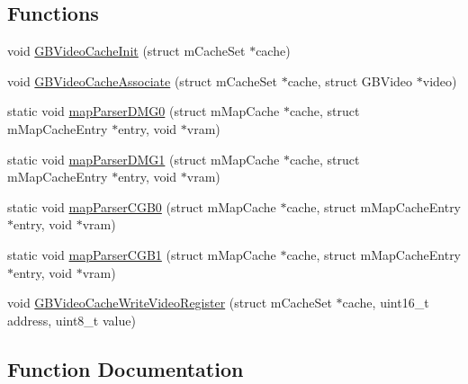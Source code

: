\subsection*{Functions}
\begin{DoxyCompactItemize}
\item 
void \mbox{\hyperlink{gb_2renderers_2cache-set_8c_ae7e228e583d5f680af631188c85bdf5e}{G\+B\+Video\+Cache\+Init}} (struct m\+Cache\+Set $\ast$cache)
\item 
void \mbox{\hyperlink{gb_2renderers_2cache-set_8c_ab2420f444ebe87f2f01729e2a3f66e37}{G\+B\+Video\+Cache\+Associate}} (struct m\+Cache\+Set $\ast$cache, struct G\+B\+Video $\ast$video)
\item 
static void \mbox{\hyperlink{gb_2renderers_2cache-set_8c_a048d8d609b74b62fd9a0812bcb0474a0}{map\+Parser\+D\+M\+G0}} (struct m\+Map\+Cache $\ast$cache, struct m\+Map\+Cache\+Entry $\ast$entry, void $\ast$vram)
\item 
static void \mbox{\hyperlink{gb_2renderers_2cache-set_8c_a0a1e89b599746b796592de6e1eab8e2b}{map\+Parser\+D\+M\+G1}} (struct m\+Map\+Cache $\ast$cache, struct m\+Map\+Cache\+Entry $\ast$entry, void $\ast$vram)
\item 
static void \mbox{\hyperlink{gb_2renderers_2cache-set_8c_a7a94c69965062992b501b1ba7d9dfed3}{map\+Parser\+C\+G\+B0}} (struct m\+Map\+Cache $\ast$cache, struct m\+Map\+Cache\+Entry $\ast$entry, void $\ast$vram)
\item 
static void \mbox{\hyperlink{gb_2renderers_2cache-set_8c_a1120d205c5f595ef19ae432fc78b9d96}{map\+Parser\+C\+G\+B1}} (struct m\+Map\+Cache $\ast$cache, struct m\+Map\+Cache\+Entry $\ast$entry, void $\ast$vram)
\item 
void \mbox{\hyperlink{gb_2renderers_2cache-set_8c_a30ce6f53accfe469551fc0454c23d53c}{G\+B\+Video\+Cache\+Write\+Video\+Register}} (struct m\+Cache\+Set $\ast$cache, uint16\+\_\+t address, uint8\+\_\+t value)
\end{DoxyCompactItemize}


\subsection{Function Documentation}
\mbox{\label{gb_2renderers_2cache-set_8c_ab2420f444ebe87f2f01729e2a3f66e37}} 
